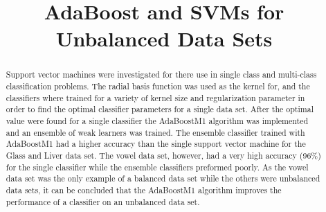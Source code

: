 \documentclass[confrence]{IEEEtran}
\begin{document}
\title{AdaBoost and SVMs for Unbalanced Data Sets}

\author{
}

\maketitle

\begin{abstract}
Support vector machines were investigated for there use in single class and multi-class classification problems.
The radial basis function was used as the kernel for, and the classifiers where trained for a variety of kernel size and regularization parameter in order to find the optimal classifier parameters for a single data set.
After the optimal value were found for a single classifier the AdaBoostM1 algorithm was implemented and an ensemble of weak learners was trained.
The ensemble classifier trained with AdaBoostM1 had a higher accuracy than the single support vector machine for the Glass and Liver data set.
The vowel data set, however, had a very high accuracy (96\%) for the single classifier while the ensemble classifiers preformed poorly.
As the vowel data set was the only example of a balanced data set while the others were unbalanced data sets, it can be concluded that the AdaBoostM1 algorithm improves the performance of a classifier on an unbalanced data set.
\end{abstract}

\IEEEpeerreviewmaketitle








\end{document}
